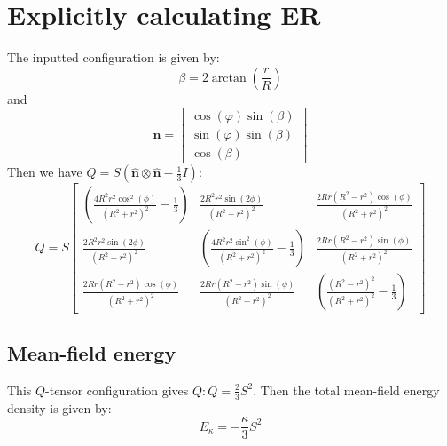 \documentclass[reqno]{article}
\begin{document}
\section{Explicitly calculating ER}

The inputted configuration is given by:
\begin{equation}
    \beta = 2 \arctan\left(\frac{r}{R}\right)
\end{equation}
and
\begin{equation}
    \mathbf{\hat{n}}
    =
    \begin{bmatrix}
        \cos(\varphi) \sin(\beta) \\
        \sin(\varphi) \sin(\beta)  \\
        \cos(\beta)
    \end{bmatrix}
\end{equation}
Then we have $Q = S\left(\mathbf{\hat{n}} \otimes \mathbf{\hat{n}} - \tfrac13 I \right)$:
\begin{equation}
    Q
    =
    S
    \begin{bmatrix}
         \left(\frac{4 R^{2} r^{2} \cos^{2}{\left(\phi \right)}}{\left(R^{2} + r^{2}\right)^{2}} - \frac{1}{3}\right) 
        & \frac{2 R^{2}  r^{2} \sin{\left(2 \phi \right)}}{\left(R^{2} + r^{2}\right)^{2}} 
        & \frac{2 R  r \left(R^{2} - r^{2}\right) \cos{\left(\phi \right)}}{\left(R^{2} + r^{2}\right)^{2}}\\
        \frac{2 R^{2}  r^{2} \sin{\left(2 \phi \right)}}{\left(R^{2} + r^{2}\right)^{2}} 
        &  \left(\frac{4 R^{2} r^{2} \sin^{2}{\left(\phi \right)}}{\left(R^{2} + r^{2}\right)^{2}} - \frac{1}{3}\right) 
        & \frac{2 R  r \left(R^{2} - r^{2}\right) \sin{\left(\phi \right)}}{\left(R^{2} + r^{2}\right)^{2}}\\
        \frac{2 R  r \left(R^{2} - r^{2}\right) \cos{\left(\phi \right)}}{\left(R^{2} + r^{2}\right)^{2}} 
        & \frac{2 R  r \left(R^{2} - r^{2}\right) \sin{\left(\phi \right)}}{\left(R^{2} + r^{2}\right)^{2}} 
        &  \left(\frac{\left(R^{2} - r^{2}\right)^{2}}{\left(R^{2} + r^{2}\right)^{2}} - \frac{1}{3}\right)
    \end{bmatrix}
\end{equation}

\subsection{Mean-field energy}

This $Q$-tensor configuration gives $Q : Q = \frac{2}{3} S^2$.
Then the total mean-field energy density is given by:
\begin{equation}
    E_{\kappa}
    =
    -\frac{\kappa}{3} S^2
\end{equation}
\end{document}

